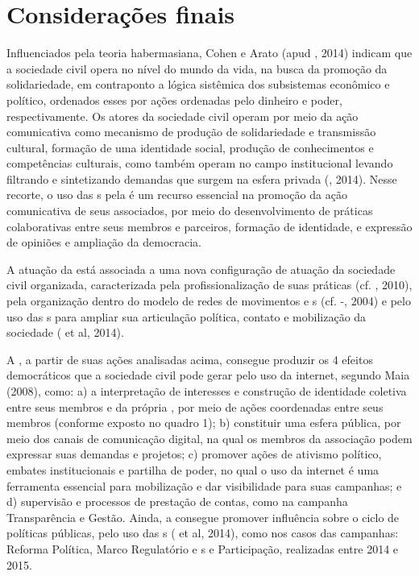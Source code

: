 \section{Considerações finais}

Influenciados pela teoria habermasiana, Cohen e Arato (apud ,
2014) indicam que a sociedade civil opera no nível do mundo da vida, na
busca da promoção da solidariedade, em contraponto a lógica sistêmica
dos subsistemas econômico e político, ordenados esses por ações
ordenadas pelo dinheiro e poder, respectivamente. Os atores da sociedade
civil operam por meio da ação comunicativa como mecanismo de produção de
solidariedade e transmissão cultural, formação de uma identidade social,
produção de conhecimentos e competências culturais, como também operam
no campo institucional levando filtrando e sintetizando demandas que
surgem na esfera privada (, 2014). Nesse recorte, o uso das s
pela  é um recurso essencial na promoção da ação comunicativa de
seus associados, por meio do desenvolvimento de práticas colaborativas
entre seus membros e parceiros, formação de identidade, e expressão de
opiniões e ampliação da democracia.

A atuação da  está associada a uma nova configuração de atuação da
sociedade civil organizada, caracterizada pela profissionalização de
suas práticas (cf. , 2010), pela organização dentro do modelo de
redes de movimentos e s (cf. -, 2004) e pelo uso das
s para ampliar sua articulação política, contato e mobilização da
sociedade ( et al, 2014).

A , a partir de suas ações analisadas acima, consegue produzir os 4
efeitos democráticos que a sociedade civil pode gerar pelo uso da
internet, segundo Maia (2008), como: a) a interpretação de interesses e
construção de identidade coletiva entre seus membros e da própria ,
por meio de ações coordenadas entre seus membros (conforme exposto no
quadro 1); b) constituir uma esfera pública, por meio dos canais de
comunicação digital, na qual os membros da associação podem expressar
suas demandas e projetos; c) promover ações de ativismo político,
embates institucionais e partilha de poder, no qual o uso da internet é
uma ferramenta essencial para mobilização e dar visibilidade para suas
campanhas; e d) supervisão e processos de prestação de contas, como na
campanha Transparência e Gestão. Ainda, a  consegue promover
influência sobre o ciclo de políticas públicas, pelo uso das s
( et al, 2014), como nos casos das campanhas: Reforma Política,
Marco Regulatório e s e Participação, realizadas entre 2014 e
2015.


